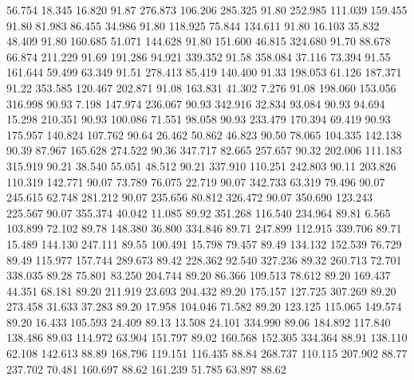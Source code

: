   56.754   18.345   16.820        91.87
 276.873  106.206  285.325        91.80
 252.985  111.039  159.455        91.80
  81.983   86.455   34.986        91.80
 118.925   75.844  134.611        91.80
  16.103   35.832   48.409        91.80
 160.685   51.071  144.628        91.80
 151.600   46.815  324.680        91.70
  88.678   66.874  211.229        91.69
 191.286   94.921  339.352        91.58
 358.084   37.116   73.394        91.55
 161.644   59.499   63.349        91.51
 278.413   85.419  140.400        91.33
 198.053   61.126  187.371        91.22
 353.585  120.467  202.871        91.08
 163.831   41.302    7.276        91.08
 198.060  153.056  316.998        90.93
   7.198  147.974  236.067        90.93
 342.916   32.834   93.084        90.93
  94.694   15.298  210.351        90.93
 100.086   71.551   98.058        90.93
 233.479  170.394   69.419        90.93
 175.957  140.824  107.762        90.64
  26.462   50.862   46.823        90.50
  78.065  104.335  142.138        90.39
  87.967  165.628  274.522        90.36
 347.717   82.665  257.657        90.32
 202.006  111.183  315.919        90.21
  38.540   55.051   48.512        90.21
 337.910  110.251  242.803        90.11
 203.826  110.319  142.771        90.07
  73.789   76.075   22.719        90.07
 342.733   63.319   79.496        90.07
 245.615   62.748  281.212        90.07
 235.656   80.812  326.472        90.07
 350.690  123.243  225.567        90.07
 355.374   40.042   11.085        89.92
 351.268  116.540  234.964        89.81
   6.565  103.899   72.102        89.78
 148.380   36.800  334.846        89.71
 247.899  112.915  339.706        89.71
  15.489  144.130  247.111        89.55
 100.491   15.798   79.457        89.49
 134.132  152.539   76.729        89.49
 115.977  157.744  289.673        89.42
 228.362   92.540  327.236        89.32
 260.713   72.701  338.035        89.28
  75.801   83.250  204.744        89.20
  86.366  109.513   78.612        89.20
 169.437   44.351   68.181        89.20
 211.919   23.693  204.432        89.20
 175.157  127.725  307.269        89.20
 273.458   31.633   37.283        89.20
  17.958  104.046   71.582        89.20
 123.125  115.065  149.574        89.20
  16.433  105.593   24.409        89.13
  13.508   24.101  334.990        89.06
 184.892  117.840  138.486        89.03
 114.972   63.904  151.797        89.02
 160.568  152.305  334.364        88.91
 138.110   62.108  142.613        88.89
 168.796  119.151  116.435        88.84
 268.737  110.115  207.902        88.77
 237.702   70.481  160.697        88.62
 161.239   51.785   63.897        88.62
